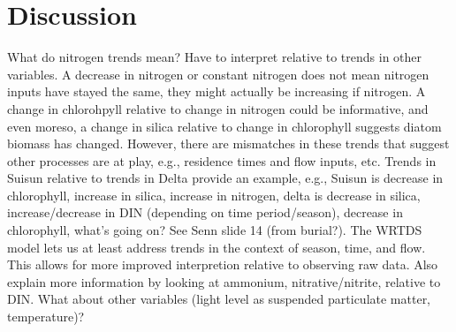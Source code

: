 \documentclass[letterpaper,12pt,oneside]{article}\usepackage[]{graphicx}\usepackage[]{color}
\begin{document}
\section{Discussion}

What do nitrogen trends mean?  Have to interpret relative to trends in other variables.  A decrease in nitrogen or constant nitrogen does not mean nitrogen inputs have stayed the same, they might actually be increasing if nitrogen.  A change in chlorohpyll relative to change in nitrogen could be informative, and even moreso, a change in silica relative to change in chlorophyll suggests diatom biomass has changed.  However, there are mismatches in these trends that suggest other processes are at play, e.g., residence times and flow inputs, etc.  Trends in Suisun relative to trends in Delta provide an example, e.g., Suisun is decrease in chlorophyll, increase in silica, increase in nitrogen, delta is decrease in silica, increase/decrease in DIN (depending on time period/season), decrease in chlorophyll, what's going on? See Senn slide 14 (from burial?). The WRTDS model lets us at least address trends in the context of season, time, and flow.  This allows for more improved interpretion relative to observing raw data. Also explain more information by looking at ammonium, nitrative/nitrite, relative to DIN. What about other variables (light level as suspended particulate matter, temperature)?

\clearpage
\begin{singlespace}


\end{singlespace}
\clearpage
\end{document}
